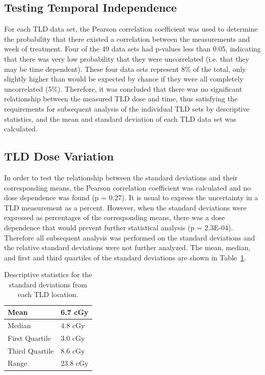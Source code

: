 \subsection{Testing Temporal Independence}
For each TLD data set, the Pearson correlation coefficient was used to determine the probability that there existed a correlation between the measurements and week of treatment. Four of the 49 data sets had p-values less than 0.05, indicating that there was very low probability that they were uncorrelated (i.e. that they may be time dependent). These four data sets represent 8\% of the total, only slightly higher than would be expected by chance if they were all completely uncorrelated (5\%). Therefore, it was concluded that there was no significant relationship between the measured TLD dose and time, thus satisfying the requirements for subsequent analysis of the individual TLD sets by descriptive statistics, and the mean and standard deviation of each TLD data set was calculated.

\subsection{TLD Dose Variation}
In order to test the relationship between the standard deviations and their corresponding means, the Pearson correlation coefficient was calculated and no dose dependence was found (p = 0.27).    It is usual to express the uncertainty in a TLD measurement as a percent. However, when the standard deviations were expressed as percentages of the corresponding means, there was a dose dependence that would prevent further statistical analysis (p = 2.3E-04). Therefore all subsequent analysis was performed on the standard deviations and the relative standard deviations were not further analyzed. The mean, median, and first and third quartiles of the standard deviations are shown in Table~\ref{tab:descrip_stats}.

\begin{table}[h]
	\centering
	\caption{Descriptive statistics for the standard deviations from each TLD location.}
	\label{tab:descrip_stats}
	\begin{tabular}{|l|l|}
		\hline
		Mean           & 6.7 cGy  \\ \hline
		Median         & 4.8 cGy  \\ \hline
		First Quartile & 3.0 cGy  \\ \hline
		Third Quartile & 8.6 cGy  \\ \hline
		Range          & 23.8 cGy \\ \hline
	\end{tabular}
\end{table}

